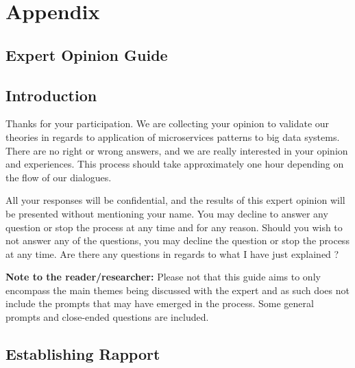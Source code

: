 \documentclass{bmcart}
\begin{document}
\section*{Appendix}


\begin{backmatter}

\section*{Expert Opinion Guide} \label{interviewGuide}

\subsection*{Introduction}

Thanks for your participation. We are collecting your opinion to validate our theories in regards to application of microservices patterns to big data systems. There are no right or wrong answers, and we are really interested in your opinion and experiences. This process should take approximately one hour depending on the flow of our dialogues. 

All your responses will be confidential, and the results of this expert opinion will be presented without mentioning your name. You may decline to answer any question or stop the process at any time and for any reason. Should you wish to not answer any of the questions, you may decline the question or stop the process at any time. Are there any questions in regards to what I have just explained ?

\hspace{2cm}

\textbf{Note to the reader/researcher:} Please not that this guide aims to only encompass the main themes being discussed with the expert and as such does not include the prompts that may have emerged in the process. Some general prompts and close-ended questions are included.


\subsection*{\textbf{Establishing Rapport}}


\end{backmatter}
\end{document}
